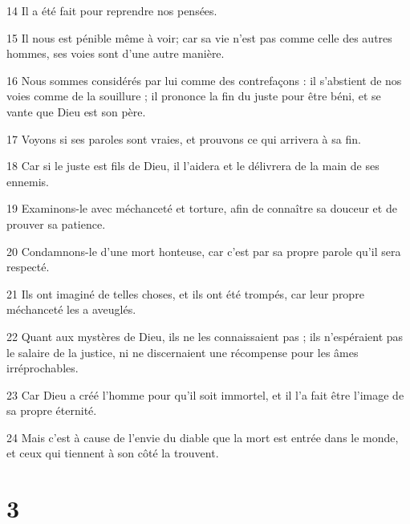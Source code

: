 \par 14 Il a été fait pour reprendre nos pensées.
\par 15 Il nous est pénible même à voir; car sa vie n'est pas comme celle des autres hommes, ses voies sont d'une autre manière.
\par 16 Nous sommes considérés par lui comme des contrefaçons : il s'abstient de nos voies comme de la souillure ; il prononce la fin du juste pour être béni, et se vante que Dieu est son père.
\par 17 Voyons si ses paroles sont vraies, et prouvons ce qui arrivera à sa fin.
\par 18 Car si le juste est fils de Dieu, il l'aidera et le délivrera de la main de ses ennemis.
\par 19 Examinons-le avec méchanceté et torture, afin de connaître sa douceur et de prouver sa patience.
\par 20 Condamnons-le d'une mort honteuse, car c'est par sa propre parole qu'il sera respecté.
\par 21 Ils ont imaginé de telles choses, et ils ont été trompés, car leur propre méchanceté les a aveuglés.
\par 22 Quant aux mystères de Dieu, ils ne les connaissaient pas ; ils n'espéraient pas le salaire de la justice, ni ne discernaient une récompense pour les âmes irréprochables.
\par 23 Car Dieu a créé l'homme pour qu'il soit immortel, et il l'a fait être l'image de sa propre éternité.
\par 24 Mais c'est à cause de l'envie du diable que la mort est entrée dans le monde, et ceux qui tiennent à son côté la trouvent.

\chapter{3}

